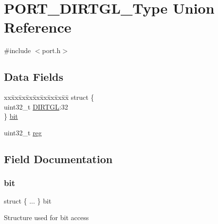 \hypertarget{union_p_o_r_t___d_i_r_t_g_l___type}{}\section{P\+O\+R\+T\+\_\+\+D\+I\+R\+T\+G\+L\+\_\+\+Type Union Reference}
\label{union_p_o_r_t___d_i_r_t_g_l___type}


{\ttfamily \#include $<$port.\+h$>$}

\subsection*{Data Fields}
\begin{DoxyCompactItemize}
\item 
\begin{tabbing}
xx\=xx\=xx\=xx\=xx\=xx\=xx\=xx\=xx\=\kill
struct \{\\
\>uint32\_t \mbox{\hyperlink{union_p_o_r_t___d_i_r_t_g_l___type_a95f93e729ae449048ae72058e80f41f6}{DIRTGL}}:32\\
\} \mbox{\hyperlink{union_p_o_r_t___d_i_r_t_g_l___type_af2574b4aabb8e6e045e37f3e51e6df0d}{bit}}\\

\end{tabbing}\item 
uint32\+\_\+t \mbox{\hyperlink{union_p_o_r_t___d_i_r_t_g_l___type_a6b91636401516a477989a336376d7b40}{reg}}
\end{DoxyCompactItemize}


\subsection{Field Documentation}
\mbox{\label{union_p_o_r_t___d_i_r_t_g_l___type_af2574b4aabb8e6e045e37f3e51e6df0d}} 
\subsubsection{\texorpdfstring{bit}{bit}}
{\footnotesize\ttfamily struct \{ ... \}   bit}

Structure used for bit access \mbox{\label{union_p_o_r_t___d_i_r_t_g_l___type_a95f93e729ae449048ae72058e80f41f6}} 
